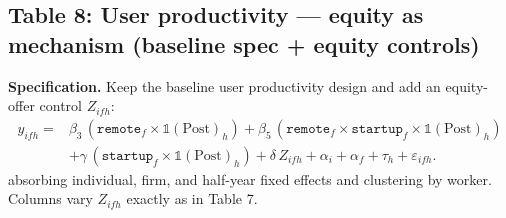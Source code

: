 \documentclass{article}
\newcommand{\cleanedresultsdir}{../../results/cleaned/tex}
\newcommand{\TableInput}[2][\linewidth]{}
\newcommand{\FloatNote}[1]{%
  \begingroup
    \captionsetup{style=noteflush}%
    \caption*{\textit{Notes:}~#1}%
  \endgroup
}
\begin{document}
\subsection*{Table 8: User productivity --- equity as mechanism (baseline spec + equity controls)}
\noindent \textbf{Specification.} Keep the baseline user productivity design and add an equity-offer control $Z_{ifh}$:
\begin{equation*}
\begin{aligned}
  y_{ifh} ={}&
  \beta_3\,(\texttt{remote}_f\times \mathds{1}(\text{Post})_h)
  + \beta_5\,(\texttt{remote}_f\times \texttt{startup}_f\times \mathds{1}(\text{Post})_h) \\
  &+ \gamma\,(\texttt{startup}_f\times \mathds{1}(\text{Post})_h)
  + \delta\,Z_{ifh}
  + \alpha_i + \alpha_f + \tau_h + \varepsilon_{ifh}.
\end{aligned}
\end{equation*}
absorbing individual, firm, and half-year fixed effects and clustering by worker. Columns vary $Z_{ifh}$ exactly as in Table 7.
\begin{table}[H]\centering
  \caption{User productivity: equity as mechanism (baseline spec + equity controls)}
  \TableInput{\cleanedresultsdir/llm_equity_mechanism_variants_user.tex}
  \FloatNote{Rows report the baseline remote coefficients $\beta_3$ on $\texttt{Remote}\times\mathds{1}(\text{Post})$ and $\beta_5$ on $\texttt{Remote}\times\mathds{1}(\text{Post})\times\text{Startup}$; the post remote effect for startups is their sum. Columns (1)--(4) differ only by the equity control included (bottom panel checkmarks). Panel A reports OLS and Panel B reports IV (instrumenting the remote interaction terms with teleworkability interaction counterparts). Standard errors are clustered by worker and reported in parentheses; *, **, *** denote $p<0.10, 0.05, 0.01$.}
\end{table}
\end{document}
